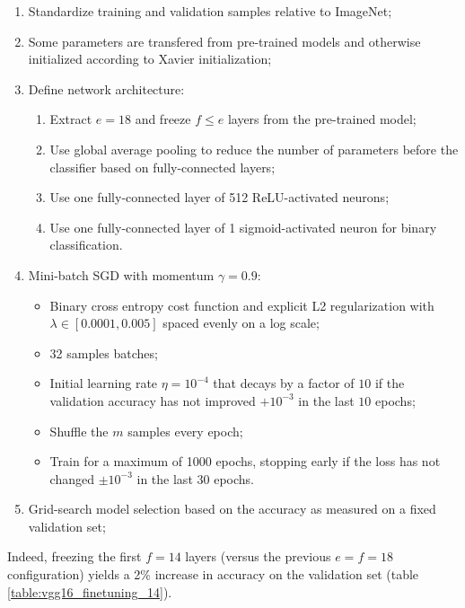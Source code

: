 \begin{enumerate}
    \item Standardize training and validation samples relative to ImageNet;
    \item Some parameters are transfered from pre-trained models and otherwise initialized according to Xavier initialization;
    \item Define network architecture:
        \begin{enumerate}
            \item Extract $e = 18$ and freeze $f \leq e$ layers from the pre-trained model;
            \item Use global average pooling to reduce the number of parameters before the classifier based on fully-connected layers;
            \item Use one fully-connected layer of 512 ReLU-activated neurons;
            \item Use one fully-connected layer of 1 sigmoid-activated neuron for binary classification.
        \end{enumerate}
    \item Mini-batch \ac{SGD} with momentum $\gamma = 0.9$:
        \begin{itemize}
            \item Binary cross entropy cost function and explicit L2 regularization with $\lambda \in [0.0001, 0.005]$ spaced evenly on a log scale;
            \item 32 samples batches;
            \item Initial learning rate $\eta = 10^{-4}$ that decays by a factor of $10$ if the validation accuracy has not improved $+10^{-3}$ in the last $10$ epochs;
            \item Shuffle the $m$ samples every epoch;
            \item Train for a maximum of 1000 epochs, stopping early if the loss has not changed $\pm 10^{-3}$ in the last $30$ epochs.
        \end{itemize}
    \item Grid-search model selection based on the accuracy as measured on a fixed validation set;
\end{enumerate}

Indeed, freezing the first $f = 14$ layers (versus the previous $e = f = 18$ configuration) yields a 2\% increase in accuracy on the validation set (table \ref{table:vgg16_finetuning_14}).

